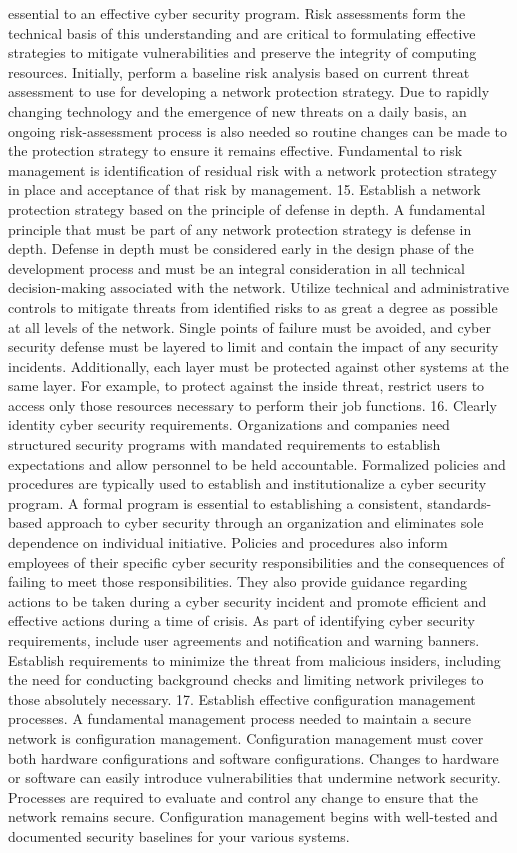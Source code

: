\documentclass{article}
\begin{document}
essential to an effective cyber security program. Risk assessments form
the technical basis of this understanding and are critical to
formulating effective strategies to mitigate vulnerabilities and
preserve the integrity of computing resources. Initially, perform a
baseline risk analysis based on current threat assessment to use for
developing a network protection strategy. Due to rapidly changing
technology and the emergence of new threats on a daily basis, an ongoing
risk-assessment process is also needed so routine changes can be made to
the protection strategy to ensure it remains effective. Fundamental to
risk management is identification of residual risk with a network
protection strategy in place and acceptance of that risk by management.
15. Establish a network protection strategy based on the principle of
defense in depth. A fundamental principle that must be part of any
network protection strategy is defense in depth. Defense in depth must
be considered early in the design phase of the development process and
must be an integral consideration in all technical decision-making
associated with the network. Utilize technical and administrative
controls to mitigate threats from identified risks to as great a degree
as possible at all levels of the network. Single points of failure must
be avoided, and cyber security defense must be layered to limit and
contain the impact of any security incidents. Additionally, each layer
must be protected against other systems at the same layer. For example,
to protect against the inside threat, restrict users to access only
those resources necessary to perform their job functions. 16. Clearly
identity cyber security requirements. Organizations and companies need
structured security programs with mandated requirements to establish
expectations and allow personnel to be held accountable. Formalized
policies and procedures are typically used to establish and
institutionalize a cyber security program. A formal program is essential
to establishing a consistent, standards-based approach to cyber security
through an organization and eliminates sole dependence on individual
initiative. Policies and procedures also inform employees of their
specific cyber security responsibilities and the consequences of failing
to meet those responsibilities. They also provide guidance regarding
actions to be taken during a cyber security incident and promote
efficient and effective actions during a time of crisis. As part of
identifying cyber security requirements, include user agreements and
notification and warning banners. Establish requirements to minimize the
threat from malicious insiders, including the need for conducting
background checks and limiting network privileges to those absolutely
necessary. 17. Establish effective configuration management processes. A
fundamental management process needed to maintain a secure network is
configuration management. Configuration management must cover both
hardware configurations and software configurations. Changes to hardware
or software can easily introduce vulnerabilities that undermine network
security. Processes are required to evaluate and control any change to
ensure that the network remains secure. Configuration management begins
with well-tested and documented security baselines for your various
systems.
\end{document}
